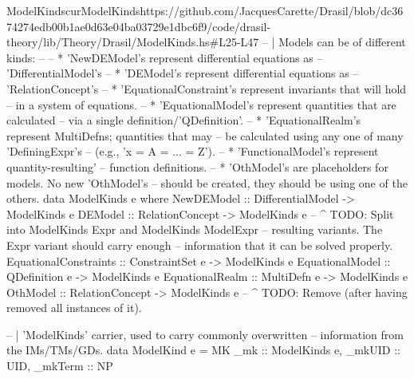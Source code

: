 \begin{haskell}{ModelKinds}{curModelKinds}{}{https://github.com/JacquesCarette/Drasil/blob/dc3674274edb00b1ae0d63e04ba03729e1dbc6f9/code/drasil-theory/lib/Theory/Drasil/ModelKinds.hs\#L25-L47}
-- | Models can be of different kinds: 
--
--   * 'NewDEModel's represent differential equations as 
--     'DifferentialModel's
--   * 'DEModel's represent differential equations as 
--     'RelationConcept's
--   * 'EquationalConstraint's represent invariants that will hold 
--     in a system of equations.
--   * 'EquationalModel's represent quantities that are calculated
--     via a single definition/'QDefinition'.
--   * 'EquationalRealm's represent MultiDefns; quantities that may
--     be calculated using any one of many 'DefiningExpr's
--     (e.g., 'x = A = ... = Z').
--   * 'FunctionalModel's represent quantity-resulting'
--     function definitions.
--   * 'OthModel's are placeholders for models. No new 'OthModel's 
--     should be created, they should be using one of the others.
data ModelKinds e where
  NewDEModel            :: DifferentialModel -> ModelKinds e
  DEModel               :: RelationConcept   -> ModelKinds e 
  -- ^ TODO: Split into ModelKinds Expr and ModelKinds ModelExpr
  --   resulting variants. The Expr variant should carry enough
  --   information that it can be solved properly.
  EquationalConstraints :: ConstraintSet e   -> ModelKinds e
  EquationalModel       :: QDefinition e     -> ModelKinds e
  EquationalRealm       :: MultiDefn e       -> ModelKinds e
  OthModel              :: RelationConcept   -> ModelKinds e 
  -- ^ TODO: Remove (after having removed all instances of it).


-- | 'ModelKinds' carrier, used to carry commonly overwritten 
--   information from the IMs/TMs/GDs.
data ModelKind e = MK {
  _mk     :: ModelKinds e,
  _mkUID  :: UID,
  _mkTerm :: NP
}
\end{haskell}

